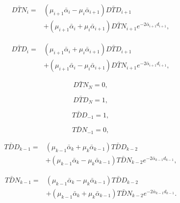 \documentclass{IEEEtran4PSCC}
\begin{document}
\begin{equation}\label{eq:DTN}
	\begin{aligned}
		D\bar{T}N_{i} = {} & (\mu_{i+1}\bar\alpha_{i} - \mu_{i}\bar\alpha_{i+1})D\bar{T}D_{i+1} \\
		& + (\mu_{i+1}\bar\alpha_{i} + \mu_{i}\bar\alpha_{i+1})D\bar{T}N_{i+1}e^{-2\bar\alpha_{i+1}d_{i+1}},
	\end{aligned}
\end{equation}  

\begin{equation}
	\begin{aligned}
		D\bar{T}D_{i} = {} & (\mu_{i+1}\bar\alpha_{i} + \mu_{i}\bar\alpha_{i+1})D\bar{T}D_{i+1} \\
		& + (\mu_{i+1}\bar\alpha_{i} - \mu_{i}\bar\alpha_{i+1})D\bar{T}N_{i+1}e^{-2\bar\alpha_{i+1}d_{i+1}},
	\end{aligned}
\end{equation} 

\begin{equation}
	D\bar{T}N_{N} = 0,
\end{equation}

\begin{equation}
	D\bar{T}D_{N} = 1,
\end{equation}

\begin{equation}
	T\bar{D}D_{-1} = 1,
\end{equation}

\begin{equation}
	T\bar{D}N_{-1} = 0,
\end{equation}

\begin{equation}
	\begin{aligned}
		T\bar{D}D_{k-1} = {} & (\mu_{k-1}\bar\alpha_{k} + \mu_{k}\bar\alpha_{k-1})T\bar{D}D_{k-2} \\
		& + (\mu_{k-1}\bar\alpha_{k} - \mu_{k}\bar\alpha_{k-1})T\bar{D}N_{k-2}e^{-2\bar\alpha_{k-1}d_{k-1}},
	\end{aligned}
\end{equation} 

\begin{equation}\label{eq:TDN}
	\begin{aligned}
		T\bar{D}N_{k-1} = {} & (\mu_{k-1}\bar\alpha_{k} - \mu_{k}\bar\alpha_{k-1})T\bar{D}D_{k-2} \\
		& + (\mu_{k-1}\bar\alpha_{k} + \mu_{k}\bar\alpha_{k-1})T\bar{D}N_{k-2}e^{-2\bar\alpha_{k-1}d_{k-1}}.
	\end{aligned}
\end{equation}
\end{document}
